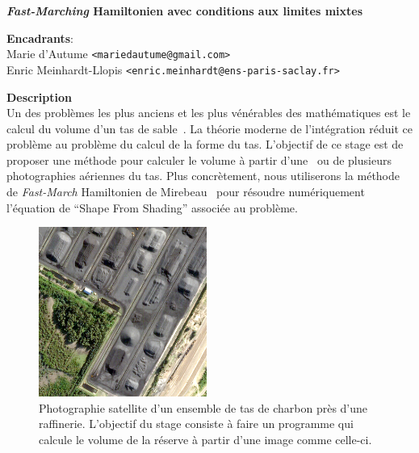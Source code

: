 \documentclass[a4paper,10pt]{article}
\begin{document}
\thispagestyle{empty}

{\bf
	\emph{Fast-Marching} Hamiltonien avec conditions aux limites mixtes
}

{\bf Encadrants}:\\
Marie d'Autume \verb+<mariedautume@gmail.com>+ \\
Enric Meinhardt-Llopis \verb+<enric.meinhardt@ens-paris-saclay.fr>+

{\bf Description}\\
Un des problèmes les plus anciens et les plus vénérables des mathématiques est
le calcul du volume d'un tas de sable~\cite{archimedes,monge}.  La théorie
moderne de l'intégration réduit ce problème au problème du calcul de la forme
du tas.  L'objectif de ce stage est de proposer une méthode pour
calculer le volume à partir d'une~\cite{horn} ou de plusieurs~\cite{woodham}
photographies aériennes du tas.
Plus concrètement, nous utiliserons la méthode de \emph{Fast-March} Hamiltonien
de Mirebeau~\cite{mirebeau} pour résoudre numériquement l'équation de ``Shape
From Shading'' associée au problème.

\begin{figure}[H]
	\begin{center}
		\includegraphics[width=0.49\textwidth]{f/sv.png}
	\end{center}
    \vspace{-1.5em}
	\caption{
		Photographie satellite d'un ensemble de tas de charbon près
		d'une raffinerie.  L'objectif du stage consiste à faire un
		programme qui calcule le volume de la réserve à partir d'une
		image comme celle-ci.
	}
\end{figure}
\end{document}
